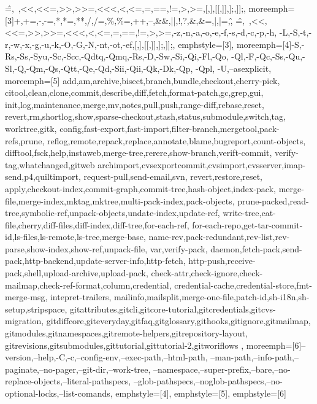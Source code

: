 {{  \^=,~,<<,<<=,>>,>>=,<<<,<,<=,=,==,!=,>,>=,[,],[[,]],];,]];},
  moreemph=[3]{+,+=,-,-=,*,*=,**,/,/=,\%,\%=,++,--,\&\&,||,!,?,\&,\&=,|,|=,\^,
  \^=,~,<<,<<=,>>,>>=,<<<,<,<=,=,==,!=,>,>=,-z,-n,-a,-o,-e,-f,-s,-d,-c,-p,-h,
  -L,-S,-t,-r,-w,-x,-g,-u,-k,-O,-G,-N,-nt,-ot,-ef,[,],[[,]],];,]];},
  emphstyle=[3]{\color{brightcyan}},
  moreemph=[4]{-S,-Rs,-Ss,-Syu,-Sc,-Scc,-Qdtq,-Qmq,-Rs,-D,-Sw,-Si,-Qi,-Fl,-Qo,
  -Ql,-F,-Qc,-Ss,-Qu,-Sl,-Q,-Qm,-Qs,-Qtt,-Qe,-Qd,-Sii,-Qii,-Qk,-Dk,-Qp, -Qpl,
  -U,--asexplicit},
  moreemph=[5]{%
    add,am,archive,bisect,branch,bundle,checkout,cherry-pick,
    citool,clean,clone,commit,describe,diff,fetch,format-patch,gc,grep,gui,
    init,log,maintenance,merge,mv,notes,pull,push,range-diff,rebase,reset,
    revert,rm,shortlog,show,sparse-checkout,stash,status,submodule,switch,tag,
    worktree,gitk,
    config,fast-export,fast-import,filter-branch,mergetool,pack-refs,prune,
    reflog,remote,repack,replace,annotate,blame,bugreport,count-objects,
    difftool,fsck,help,instaweb,merge-tree,rerere,show-branch,verift-commit,
    verify-tag,whatchanged,gitweb
    archimport,cvsexportcommit,cvsimport,cvsserver,imap-send,p4,quiltimport,
    request-pull,send-email,svn,
    revert,restore,reset,
    apply,checkout-index,commit-graph,commit-tree,hash-object,index-pack,
    merge-file,merge-index,mktag,mktree,multi-pack-index,pack-objects,
    prune-packed,read-tree,symbolic-ref,unpack-objects,undate-index,update-ref,
    write-tree,cat-file,cherry,diff-files,diff-index,diff-tree,for-each-ref,
    for-each-repo,get-tar-commit-id,ls-files,ls-remote,ls-tree,merge-base,
    name-rev,pack-redundant,rev-list,rev-parse,show-index,show-ref,unpack-file,
    var,verify-pack,
    daemon,fetch-pack,send-pack,http-backend,update-server-info,http-fetch,
    http-push,receive-pack,shell,upload-archive,upload-pack,
    check-attr,check-ignore,check-mailmap,check-ref-format,column,credential,
    credential-cache,credential-store,fmt-merge-msg, intepret-trailers,
    mailinfo,mailsplit,merge-one-file,patch-id,sh-i18n,sh-setup,stripspace,
  gitattributes,gitcli,gitcore-tutorial,gitcredentials,gitcvs-migration,
  gitdiffcore,giteveryday,gitfaq,gitglossary,githooks,gitignore,gitmailmap,
  gitmodules,gitnamespaces,gitremote-helpers,gitrepository-layout,
  gitrevisions,gitsubmodules,gittutorial,gittutorial-2,gitworiflows
  },
  moreemph=[6]{--version,--help,-C,-c,--config-env,--exec-path,--html-path,
  --man-path,--info-path,--paginate,--no-pager,--git-dir,--work-tree,
  --namespace,--super-prefix,--bare,--no-replace-objects,--literal-pathspecs,
  --glob-pathspecs,--noglob-pathspecs,--no-optional-locks,--list-comands},
  emphstyle=[4]{\color{brightgreen}},
  emphstyle=[5]{\color{green}},
  emphstyle=[6]{\color{magenta}}
}
